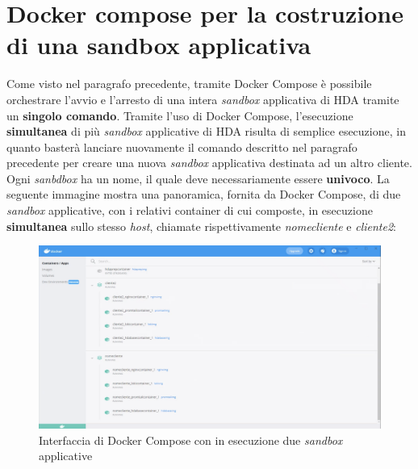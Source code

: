 

\section{Docker compose per la costruzione di una sandbox applicativa}
Come visto nel paragrafo precedente, tramite Docker Compose è possibile orchestrare l'avvio e l'arresto di una intera \textit{sandbox} applicativa di HDA tramite un \textbf{singolo comando}. Tramite l'uso di Docker Compose, l'esecuzione \textbf{simultanea} di più \textit{sandbox} applicative di HDA risulta di semplice esecuzione, in quanto basterà lanciare nuovamente il comando descritto nel paragrafo precedente per creare una nuova \textit{sandbox} applicativa destinata ad un altro cliente. \\
Ogni \textit{sanbdbox} ha un nome, il quale deve necessariamente essere \textbf{univoco}.
La seguente immagine mostra una panoramica, fornita da Docker Compose, di due \textit{sandbox} applicative, con i relativi container di cui composte, in esecuzione \textbf{simultanea} sullo stesso \textit{host}, chiamate rispettivamente \textit{nomecliente} e \textit{cliente2}:
\begin{figure}[!h]     
\centering 
    \includegraphics[width=1.0\columnwidth]{immagini/screenshot/docker_compose_sandbox} 
    \caption{Interfaccia di Docker Compose con in esecuzione due \textit{sandbox} applicative}
\end{figure} \\


